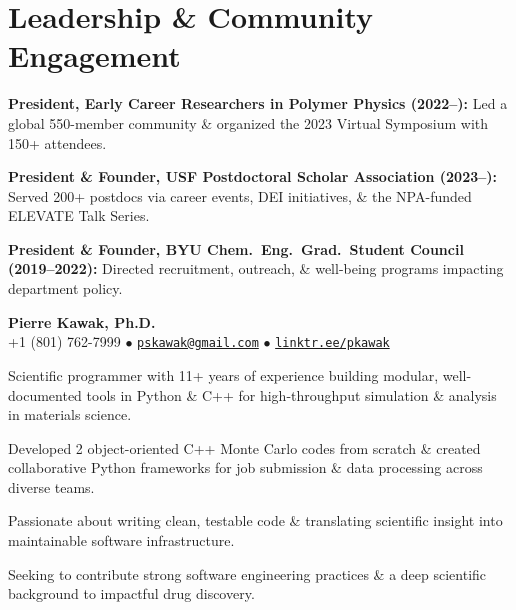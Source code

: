 \section*{Leadership \& Community Engagement}
\begin{tabitemize}
  \item \textbf{President, Early Career Researchers in Polymer Physics (2022–):} Led a global 550-member community \& organized the 2023 Virtual Symposium with 150+ attendees.
  \item \textbf{President \& Founder, USF Postdoctoral Scholar Association (2023–):} Served 200+ postdocs via career events, DEI initiatives, \& the NPA-funded ELEVATE Talk Series.
  \item \textbf{President \& Founder, BYU Chem.~Eng.~Grad.~Student Council (2019–2022):} Directed recruitment, outreach, \& well-being programs impacting department policy.
\end{tabitemize}
\vspace{1.0\baselineskip}

\begin{center}
  {\LARGE \textbf{Pierre Kawak, Ph.D.} }\\[1ex]
  +1 (801) 762-7999 $\bullet$ \href{mailto:pskawak@gmail.com}{\tt pskawak@gmail.com} $\bullet$ \href{https://linktr.ee/pkawak}{\tt linktr.ee/pkawak}\\
\end{center}
\begin{tabitemize}
  \item Scientific programmer with 11+ years of experience building modular, well-documented tools in Python \& C++ for high-throughput simulation \& analysis in materials science.
  \item Developed 2 object-oriented C++ Monte Carlo codes from scratch \& created collaborative Python frameworks for job submission \& data processing across diverse teams.
  \item Passionate about writing clean, testable code \& translating scientific insight into maintainable software infrastructure.
  \item Seeking to contribute strong software engineering practices \& a deep scientific background to impactful drug discovery.
\end{tabitemize}
